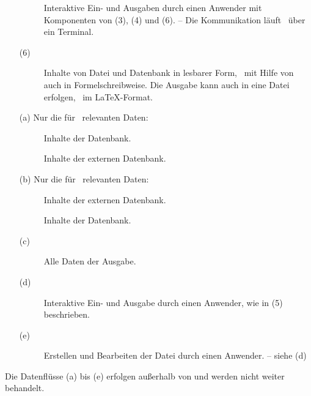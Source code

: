 \begin{itemize}
\begin{description}
		Interaktive Ein- und Ausgaben durch einen Anwender mit Komponenten von (3), (4) und (6).
		-- Die Kommunikation läuft \textiAlg\ über ein Terminal.
	\end{description}
	\item[(6)]\label{dat:Ausgabe}
	\begin{description}
		\item[]\label{dat:inAusgabe}
		Inhalte von Datei und Datenbank in lesbarer Form, \textua\ mit Hilfe von  auch in Formelschreibweise.
		Die Ausgabe kann auch in eine Datei erfolgen,
		\textzB\ im \LaTeX-Format.
	\end{description}
	\item[(a)]\label{dat:extInternet}
	Nur die für \ASBA\ relevanten Daten:
	\begin{description}
		\item[]\label{dat:ausextInternet}
		Inhalte der Datenbank.
		\item[]\label{dat:inextInternet}
		Inhalte der externen Datenbank.
	\end{description}
	\item[(b)]\label{dat:extDatenbank}
	Nur die für \ASBA\ relevanten Daten:
	\begin{description}
		\item[]
		\label{dat:ausextDatenbank} Inhalte der externen Datenbank.
		\item[]
		\label{dat:inextDatenbank} Inhalte der Datenbank.
	\end{description}
	\item[(c)]\label{dat:AusgabeAnwender}
	\begin{description}
		\item[]\label{dat:Ausgabe2Anwender}
		Alle Daten der Ausgabe.
	\end{description}
	\item[(d)] \label{dat:AnwenderTerminal}
	\begin{description}
		\item[]\label{dat:Anwender22Terminal}
		Interaktive Ein- und Ausgabe durch einen Anwender, wie in (5) beschrieben.
	\end{description}
	\item[(e)] \label{dat:TerminalDatei}
	\begin{description}
		\item[]\label{dat:Terminal22Datei}
		Erstellen und Bearbeiten der Datei durch einen Anwender.
		-- siehe (d)
	\end{description}
\end{itemize}
Die Datenflüsse (a) bis (e) erfolgen außerhalb von \ASBA
und werden nicht weiter behandelt.

